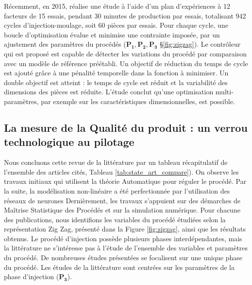 Récemment, en 2015, \cite{johnston_-line_2015} réalise une étude à l'aide d'un plan d'expériences à 12 facteurs de 15 essais, pendant 30 minutes de production par essais, totalisant 942 cycles d'injection-moulage, soit 60 pièces par essais.
Pour chaque cycle, une boucle d'optimisation évalue et minimise une contrainte imposée, par un ajustement des paramètres du procédés ($\boldsymbol{P_1, P_2, P_3}$ §\ref{fig:zigzag}).
Le contrôleur qui est proposé est capable de détecter les variations du procédé par comparaison avec un modèle de référence préétabli.
Un objectif de réduction du temps de cycle est ajouté grâce à une pénalité temporelle dans la fonction à minimiser.
Un double objectif est atteint : le temps de cycle est réduit et la variabilité des dimensions des pièces est réduite.
L'étude conclut qu’une optimisation  multi-paramètres, par exemple sur les caractéristiques dimensionnelles, est possible.

\subsection{La mesure de la Qualité du produit : un verrou technologique au pilotage}
Nous concluons cette revue de la littérature par un tableau récapitulatif de l’ensemble des articles cités, Tableau \ref{tab:state_art_compare}).
On observe les travaux initiaux qui utilisent la théorie Automatique pour réguler le procédé.
Par la suite, la modélisation non-linéaire a été perfectionnée par l'utilisation des réseaux de neurones
Dernièrement, les travaux s'appuient sur des démarches de Maîtrise Statistique des Procédés et sur la simulation numérique.
Pour chacune des publications, nous identifions les variables du procédé étudiées selon la représentation Zig Zag, présenté dans la Figure \ref{fig:zigzag}, ainsi que les résultats obtenus.
Le procédé d’injection possède plusieurs phases interdépendantes, mais la littérature ne s’intéresse pas à l’étude de l’ensemble des variables et paramètres du procédé.
De nombreuses études présentées se focalisent sur une unique phase du procédé.
Les études de la littérature sont centrées sur les paramètres de la phase d’injection ($\boldsymbol{P_3}$).

